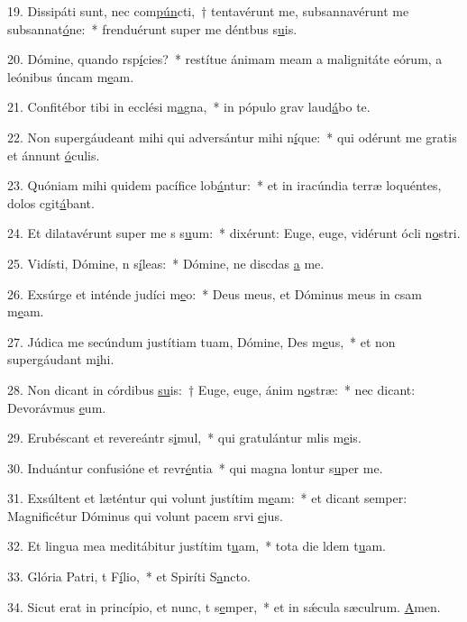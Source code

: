 19. Dissipáti sunt, nec com\uline{pún}cti,~† tentavérunt me, subsannavérunt me subsannat\uline{ó}ne:~* frenduérunt super me déntbus s\uline{u}is.\par 
20. Dómine, quando rsp\uline{í}cies?~* restítue ánimam meam a malignitáte eórum, a leónibus úncam m\uline{e}am.\par 
21. Confitébor tibi in ecclési m\uline{a}gna,~* in pópulo grav laud\uline{á}bo te.\par 
22. Non supergáudeant mihi qui adversántur mihi n\uline{í}que:~* qui odérunt me gratis et ánnunt \uline{ó}culis.\par 
23. Quóniam mihi quidem pacífice lob\uline{á}ntur:~* et in iracúndia terræ loquéntes, dolos cgit\uline{á}bant.\par 
24. Et dilatavérunt super me s s\uline{u}um:~* dixérunt: Euge, euge, vidérunt ócli n\uline{o}stri.\par 
25. Vidísti, Dómine, n s\uline{í}leas:~* Dómine, ne discdas \uline{a} me.\par 
26. Exsúrge et inténde judíci m\uline{e}o:~* Deus meus, et Dóminus meus in csam m\uline{e}am.\par 
27. Júdica me secúndum justítiam tuam, Dómine, Des m\uline{e}us,~* et non supergáudant m\uline{i}hi.\par 
28. Non dicant in córdibus \uline{su}is:~† Euge, euge, ánim n\uline{o}stræ:~* nec dicant: Devorávmus \uline{e}um.\par 
29. Erubéscant et revereántr s\uline{i}mul,~* qui gratulántur mlis m\uline{e}is.\par 
30. Induántur confusióne et revr\uline{é}ntia~* qui magna lontur s\uline{u}per me.\par 
31. Exsúltent et læténtur qui volunt justítim m\uline{e}am:~* et dicant semper: Magnificétur Dóminus qui volunt pacem srvi \uline{e}jus.\par 
32. Et lingua mea meditábitur justítim t\uline{u}am,~* tota die ldem t\uline{u}am.\par 
33. Glória Patri, t F\uline{í}lio,~* et Spiríti S\uline{a}ncto.\par 
34. Sicut erat in princípio, et nunc, t s\uline{e}mper,~* et in sǽcula sæculrum. \uline{A}men.\par 
